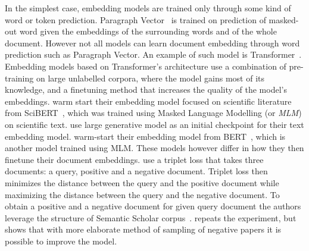 
In the simplest case, embedding models are trained only through some kind of
word or token prediction. Paragraph Vector~\citep{le2014distributed} is trained
on prediction of masked-out word given the embeddings of the surrounding words
and of the whole document. However not all models can learn document embedding
through word prediction such as Paragraph Vector. An example of such model is
Transformer~\cite{vaswani2017attention}. Embedding models based on
Transformer's architecture use a combination of pre-training on large
unlabelled corpora, where the model gains most of its knowledge, and a
finetuning method that increases the quality of the model's embeddings.
\cite{cohan2020specter} warm start their embedding model focused on scientific
literature from SciBERT~\citep{beltagy2019scibert}, which was trained using
Masked Language Modelling (or \emph{MLM}) on scientific text.
\cite{neelakantan2022text} use large generative model as an initial checkpoint
for their text embedding model. \cite{izacard2021unsupervised} warm-start their
embedding model from BERT~\citep{devlin2019bert}, which is another model
trained using MLM. These models however differ in how they then finetune their
document embeddings. \cite{cohan2020specter} use a triplet loss that takes
three documents: a query, positive and a negative document. Triplet loss then
minimizes the distance between the query and the positive document while
maximizing the distance between the query and the negative document. To obtain
a positive and a negative document for given query document the authors
leverage the structure of Semantic Scholar
corpus~\citep{ammar2018construction}. \cite{ostendorff2022neighborhood} repeats
the experiment, but shows that with more elaborate method of sampling of
negative papers it is possible to improve the model.

